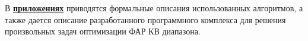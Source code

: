 В \underline{\textbf{приложениях}} приводятся формальные описания использованных алгоритмов, а также дается описание разработанного программного комплекса для решения произвольных задач оптимизации ФАР КВ диапазона.




